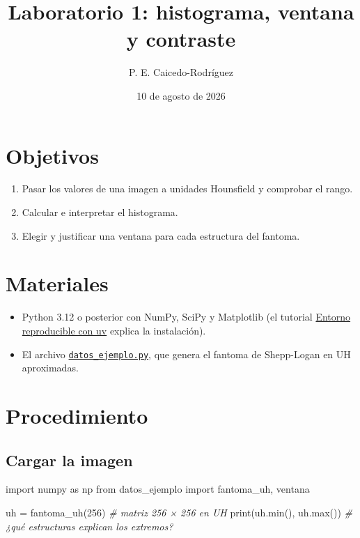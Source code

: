 \documentclass[
  spanish,
  11pt,
  a4paper,
  DIV=11,
  numbers=noendperiod]{scrartcl}
\title{Laboratorio 1: histograma, ventana y contraste}
\author{P. E. Caicedo-Rodríguez}
\date{10 de agosto de 2026}
\newenvironment{Shaded}{\begin{snugshade}}{\end{snugshade}}
\newcommand{\BuiltInTok}[1]{\textcolor[rgb]{0.04,0.38,0.43}{#1}}
\newcommand{\CommentTok}[1]{\textcolor[rgb]{0.30,0.33,0.46}{\textit{#1}}}
\newcommand{\DecValTok}[1]{\textcolor[rgb]{0.55,0.27,0.02}{#1}}
\newcommand{\ImportTok}[1]{\textcolor[rgb]{0.45,0.21,0.74}{#1}}
\newcommand{\NormalTok}[1]{\textcolor[rgb]{0.08,0.09,0.23}{#1}}
\newcommand{\OperatorTok}[1]{\textcolor[rgb]{0.08,0.09,0.23}{#1}}
\providecommand{\tightlist}{%
  \setlength{\itemsep}{0pt}\setlength{\parskip}{0pt}}
\begin{document}
\maketitle


\section{Objetivos}\label{objetivos}

\begin{enumerate}
\def\labelenumi{\arabic{enumi}.}
\tightlist
\item
  Pasar los valores de una imagen a unidades Hounsfield y comprobar el
  rango.
\item
  Calcular e interpretar el histograma.
\item
  Elegir y justificar una ventana para cada estructura del fantoma.
\end{enumerate}

\section{Materiales}\label{materiales}

\begin{itemize}
\tightlist
\item
  Python 3.12 o posterior con NumPy, SciPy y Matplotlib (el tutorial
  \href{../../../tutoriales/entorno-uv-quarto/index.qmd}{Entorno
  reproducible con uv} explica la instalación).
\item
  El archivo
  \href{../../../recursos/python/datos_ejemplo.py}{\texttt{datos\_ejemplo.py}},
  que genera el fantoma de Shepp-Logan en UH aproximadas.
\end{itemize}

\section{Procedimiento}\label{procedimiento}

\subsection{Cargar la imagen}\label{cargar-la-imagen}

\begin{Shaded}
\begin{Highlighting}[]
\ImportTok{import}\NormalTok{ numpy }\ImportTok{as}\NormalTok{ np}
\ImportTok{from}\NormalTok{ datos\_ejemplo }\ImportTok{import}\NormalTok{ fantoma\_uh, ventana}

\NormalTok{uh }\OperatorTok{=}\NormalTok{ fantoma\_uh(}\DecValTok{256}\NormalTok{)            }\CommentTok{\# matriz 256 × 256 en UH}
\BuiltInTok{print}\NormalTok{(uh.}\BuiltInTok{min}\NormalTok{(), uh.}\BuiltInTok{max}\NormalTok{())       }\CommentTok{\# ¿qué estructuras explican los extremos?}
\end{Highlighting}
\end{Shaded}
\end{document}
